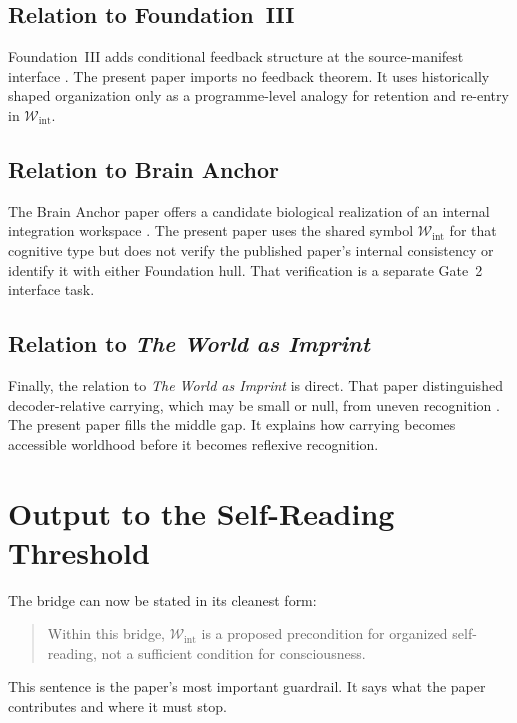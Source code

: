 \documentclass[12pt,a4paper]{article}
\begin{document}
\subsection{Relation to Foundation~III}

Foundation~III adds conditional feedback structure at the
source-manifest interface \cite{FoundationIII}. The present paper imports
no feedback theorem. It uses historically shaped organization only as a
programme-level analogy for retention and re-entry in
\(\mathcal W_{\mathrm{int}}\).

\subsection{Relation to Brain Anchor}

The Brain Anchor paper offers a candidate biological realization of an
internal integration workspace \cite{BrainAnchor}. The present paper
uses the shared symbol \(\mathcal W_{\mathrm{int}}\) for that cognitive
type but does not verify the published paper's internal consistency or
identify it with either Foundation hull. That verification is a separate
Gate~2 interface task.

\subsection{Relation to \emph{The World as Imprint}}

Finally, the relation to \emph{The World as Imprint} is direct. That paper distinguished decoder-relative carrying, which may be small or null, from uneven recognition \cite{WorldImprint}. The present paper fills the middle gap. It explains how carrying becomes accessible worldhood before it becomes reflexive recognition.

\section{Output to the Self-Reading Threshold}

The bridge can now be stated in its cleanest form:

\begin{quote}
Within this bridge, \(\mathcal W_{\mathrm{int}}\) is a proposed
precondition for organized self-reading, not a sufficient condition for
consciousness.
\end{quote}

This sentence is the paper's most important guardrail. It says what the paper contributes and where it must stop.
\end{document}
